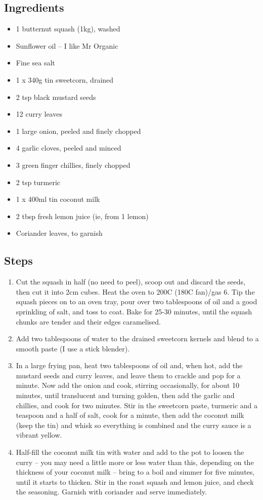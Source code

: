 \documentclass{book}
\begin{document}
\subsection*{Ingredients}
\begin{itemize}
\item 1 butternut squash (1kg), washed
\item Sunflower oil – I like Mr Organic
\item Fine sea salt
\item 1 x 340g tin sweetcorn, drained
\item 2 tsp black mustard seeds
\item 12 curry leaves
\item 1 large onion, peeled and finely chopped
\item 4 garlic cloves, peeled and minced
\item 3 green finger chillies, finely chopped
\item 2 tsp turmeric
\item 1 x 400ml tin coconut milk
\item 2 tbsp fresh lemon juice (ie, from 1 lemon)
\item Coriander leaves, to garnish
\end{itemize}

\subsection*{Steps}
\begin{enumerate}
\item Cut the squash in half (no need to peel), scoop out and discard the seeds, then cut it into 2cm cubes. Heat the oven to 200C (180C fan)/gas 6. Tip the squash pieces on to an oven tray, pour over two tablespoons of oil and a good sprinkling of salt, and toss to coat. Bake for 25-30 minutes, until the squash chunks are tender and their edges caramelised.
\item Add two tablespoons of water to the drained sweetcorn kernels and blend to a smooth paste (I use a stick blender).
\item In a large frying pan, heat two tablespoons of oil and, when hot, add the mustard seeds and curry leaves, and leave them to crackle and pop for a minute. Now add the onion and cook, stirring occasionally, for about 10 minutes, until translucent and turning golden, then add the garlic and chillies, and cook for two minutes. Stir in the sweetcorn paste, turmeric and a teaspoon and a half of salt, cook for a minute, then add the coconut milk (keep the tin) and whisk so everything is combined and the curry sauce is a vibrant yellow.
\item Half-fill the coconut milk tin with water and add to the pot to loosen the curry – you may need a little more or less water than this, depending on the thickness of your coconut milk – bring to a boil and simmer for five minutes, until it starts to thicken. Stir in the roast squash and lemon juice, and check the seasoning. Garnish with coriander and serve immediately.
\end{enumerate}
\newpage
\end{document}
